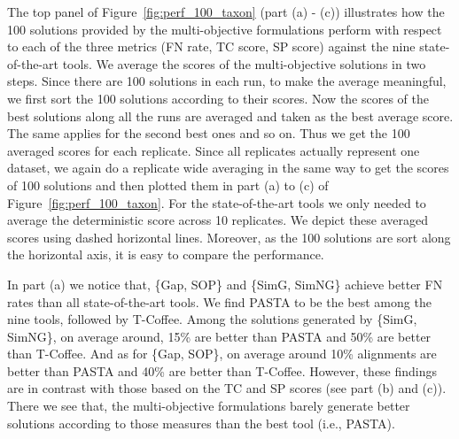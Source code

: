 The top panel of Figure~\ref{fig:perf_100_taxon} (part (a) - (c)) illustrates how the 100 solutions provided by the multi-objective formulations perform with respect to each of the three metrics (FN rate, TC score, SP score) against the nine state-of-the-art tools. We average the scores of the multi-objective solutions in two steps. Since there are 100 solutions in each run, to make the average meaningful, we first sort the 100 solutions according to their scores. Now the scores of the best solutions along all the runs are averaged and taken as the best average score. The same applies for the second best ones and so on. Thus we get the 100 averaged scores for each replicate. Since all replicates actually represent one dataset, we again do a replicate wide averaging in the same way to get the scores of 100 solutions and then plotted them in part (a) to (c) of Figure~\ref{fig:perf_100_taxon}. For the state-of-the-art tools we only needed to average the deterministic score across 10 replicates. We depict these averaged scores using dashed horizontal lines. Moreover, as the 100 solutions are sort along the horizontal axis, it is easy to compare the performance.

In part (a) we notice that, \{Gap, SOP\} and \{SimG, SimNG\} achieve better FN rates than all state-of-the-art tools. We find PASTA to be the best among the nine tools, followed by T-Coffee. Among the solutions generated by \{SimG, SimNG\}, on average around, 15\% are better than PASTA and 50\% are better than T-Coffee. And as for \{Gap, SOP\}, on average around 10\% alignments are better than PASTA and 40\% are better than T-Coffee. However, these findings are in contrast with those based on the TC and SP scores (see part (b) and (c)). There we see that, the multi-objective formulations barely generate better solutions according to those measures than the best tool (i.e., PASTA).

